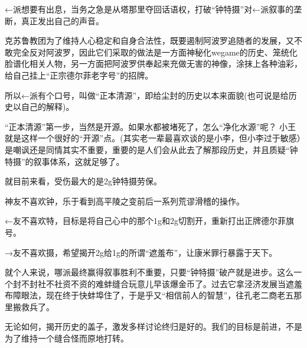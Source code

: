 \begin{zhihuanswer}
←派想要有出息，当务之急是从塔那里夺回话语权，打破``钟特摄''对←派叙事的垄断，真正发出自己的声音。

克苏鲁教团为了维持人心稳定和自身合法性，既要遏制阿波罗追随者的发展，又不敢完全反对阿波罗，因此它们采取的做法是一方面神秘化wegame的历史、笼统化脸谱化相关人物，另一方面把阿波罗供奉起来充做无害的神像，涂抹上各种油彩，给自己挂上``正宗德尔菲老字号''的招牌。

所以←派有个口号，叫做``正本清源''，即给尘封的历史以本来面貌(也可说是给历史以自己的解释)。

``正本清源''第一步，当然是开源。如果水都被堵死了，怎么``净化水源''呢？
小王就是这样一个很好的``开源''点。(其实老一辈最喜欢谈的是小李，但小李过于敏感）是嘲讽还是同情其实不重要，重要的是人们会从此去了解那段历史，并且质疑``钟特摄''的叙事体系，这就足够了。

就目前来看，受伤最大的是2g钟特摄劳保。

神友不喜欢钟，乐于看到高平陵之变前后一系列荒谬滑稽的操作。

←友不喜欢特，目标是将自己心中的那个1g和2g切割开，重新打出正牌德尔菲旗号。

→友不喜欢摄，希望揭开2g给1g的所谓``遮羞布''，让康米罪行暴露于天下。

就个人来说，哪派最终赢得叙事胜利不重要，只要``钟特摄''破产就是进步。这么一个封不封社不社资不资的难蚌缝合玩意儿早该爆金币了。过去它拿泾济发展当遮羞布障眼法，现在终于快蚌埠住了，于是乎又``相信前人的智慧''，往孔老二商老五那里搬救兵了。

无论如何，揭开历史的盖子，激发多样讨论终归是好的。我们的目标是前进，不是为了维持一个缝合怪而原地打转。
\end{zhihuanswer}
